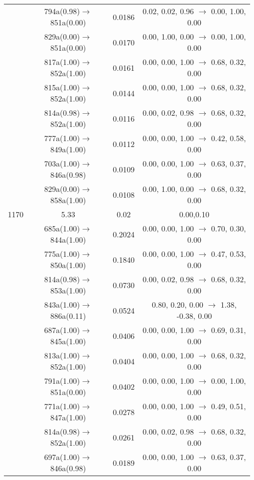 \documentclass[10pt,a4paper]{article}
\begin{document}
\begin{longtable}{c|c|c|c}
 	& 794a(0.98)$\rightarrow$851a(0.00) &	 0.0186 &	 0.02, 0.02, 0.96 $\rightarrow$ 0.00, 1.00, 0.00 \\ 
 	& 829a(0.00)$\rightarrow$851a(0.00) &	 0.0170 &	 0.00, 1.00, 0.00 $\rightarrow$ 0.00, 1.00, 0.00 \\ 
 	& 817a(1.00)$\rightarrow$852a(1.00) &	 0.0161 &	 0.00, 0.00, 1.00 $\rightarrow$ 0.68, 0.32, 0.00 \\ 
 	& 815a(1.00)$\rightarrow$852a(1.00) &	 0.0144 &	 0.00, 0.00, 1.00 $\rightarrow$ 0.68, 0.32, 0.00 \\ 
 	& 814a(0.98)$\rightarrow$852a(1.00) &	 0.0116 &	 0.00, 0.02, 0.98 $\rightarrow$ 0.68, 0.32, 0.00 \\ 
 	& 777a(1.00)$\rightarrow$849a(1.00) &	 0.0112 &	 0.00, 0.00, 1.00 $\rightarrow$ 0.42, 0.58, 0.00 \\ 
 	& 703a(1.00)$\rightarrow$846a(0.98) &	 0.0109 &	 0.00, 0.00, 1.00 $\rightarrow$ 0.63, 0.37, 0.00 \\ 
 	& 829a(0.00)$\rightarrow$858a(1.00) &	 0.0108 &	 0.00, 1.00, 0.00 $\rightarrow$ 0.68, 0.32, 0.00 \\ 
 \hline1170 &	 5.33 &	 0.02 &	 0.00,0.10 \\ 
  	& 685a(1.00)$\rightarrow$844a(1.00) &	 0.2024 &	 0.00, 0.00, 1.00 $\rightarrow$ 0.70, 0.30, 0.00 \\ 
 	& 775a(1.00)$\rightarrow$850a(1.00) &	 0.1840 &	 0.00, 0.00, 1.00 $\rightarrow$ 0.47, 0.53, 0.00 \\ 
 	& 814a(0.98)$\rightarrow$853a(1.00) &	 0.0730 &	 0.00, 0.02, 0.98 $\rightarrow$ 0.68, 0.32, 0.00 \\ 
 	& 843a(1.00)$\rightarrow$886a(0.11) &	 0.0524 &	 0.80, 0.20, 0.00 $\rightarrow$ 1.38, -0.38, 0.00 \\ 
 	& 687a(1.00)$\rightarrow$845a(1.00) &	 0.0406 &	 0.00, 0.00, 1.00 $\rightarrow$ 0.69, 0.31, 0.00 \\ 
 	& 813a(1.00)$\rightarrow$852a(1.00) &	 0.0404 &	 0.00, 0.00, 1.00 $\rightarrow$ 0.68, 0.32, 0.00 \\ 
 	& 791a(1.00)$\rightarrow$851a(0.00) &	 0.0402 &	 0.00, 0.00, 1.00 $\rightarrow$ 0.00, 1.00, 0.00 \\ 
 	& 771a(1.00)$\rightarrow$847a(1.00) &	 0.0278 &	 0.00, 0.00, 1.00 $\rightarrow$ 0.49, 0.51, 0.00 \\ 
 	& 814a(0.98)$\rightarrow$852a(1.00) &	 0.0261 &	 0.00, 0.02, 0.98 $\rightarrow$ 0.68, 0.32, 0.00 \\ 
 	& 697a(1.00)$\rightarrow$846a(0.98) &	 0.0189 &	 0.00, 0.00, 1.00 $\rightarrow$ 0.63, 0.37, 0.00 \\ 

\end{longtable}
\end{document}
